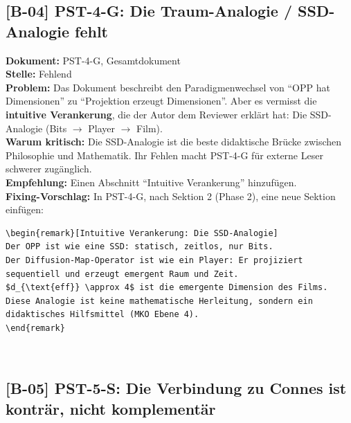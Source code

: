 \documentclass[11pt,a4paper]{article}
\newcommand{\B}[1]{\textbf{[B-#1]}}
\newcommand{\Dok}[1]{\textbf{Dokument:} #1\\}
\newcommand{\Stelle}[1]{\textbf{Stelle:} #1\\}
\newcommand{\Prob}[1]{\textbf{Problem:} #1\\}
\newcommand{\Krit}[1]{\textbf{Warum kritisch:} #1\\}
\newcommand{\Empf}[1]{\textbf{Empfehlung:} #1\\}
\newcommand{\Fix}[1]{\textbf{Fixing-Vorschlag:} #1\\}
\begin{document}
\subsection{\B{04} PST-4-G: Die Traum-Analogie / SSD-Analogie fehlt}

\Dok{PST-4-G, Gesamtdokument}
\Stelle{Fehlend}
\Prob{Das Dokument beschreibt den Paradigmenwechsel von ``OPP hat
Dimensionen'' zu ``Projektion erzeugt Dimensionen''. Aber es
vermisst die \textbf{intuitive Verankerung}, die der Autor dem
Reviewer erkl\"{a}rt hat: Die SSD-Analogie (Bits $\to$ Player $\to$
Film).}
\Krit{Die SSD-Analogie ist die beste didaktische Br\"{u}cke zwischen
Philosophie und Mathematik. Ihr Fehlen macht PST-4-G f\"{u}r externe
Leser schwerer zug\"{a}nglich.}
\Empf{Einen Abschnitt ``Intuitive Verankerung'' hinzuf\"{u}gen.}
\Fix{In PST-4-G, nach Sektion 2 (Phase 2), eine neue Sektion
einf\"{u}gen:
\begin{verbatim}
\begin{remark}[Intuitive Verankerung: Die SSD-Analogie]
Der OPP ist wie eine SSD: statisch, zeitlos, nur Bits.
Der Diffusion-Map-Operator ist wie ein Player: Er projiziert
sequentiell und erzeugt emergent Raum und Zeit.
$d_{\text{eff}} \approx 4$ ist die emergente Dimension des Films.
Diese Analogie ist keine mathematische Herleitung, sondern ein
didaktisches Hilfsmittel (MKO Ebene 4).
\end{remark}
\end{verbatim}}

\subsection{\B{05} PST-5-S: Die Verbindung zu Connes ist kontr\"{a}r,
nicht komplement\"{a}r}
\end{document}
